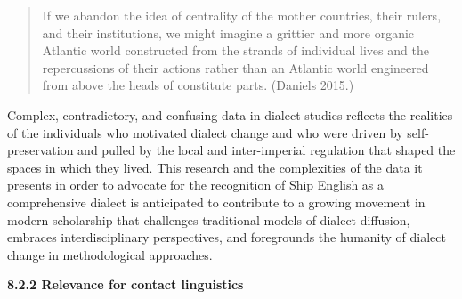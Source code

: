 \begin{quotation}
If we abandon the idea of centrality of the mother countries, their rulers, and their institutions, we might imagine a grittier and more organic Atlantic world constructed from the strands of individual lives and the repercussions of their actions rather than an Atlantic world engineered from above the heads of constitute parts. (Daniels 2015.)

\end{quotation}
\begin{styleStandard}
Complex, contradictory, and confusing data in dialect studies reflects the realities of the individuals who motivated dialect change and who were driven by self-preservation and pulled by the local and inter-imperial regulation that shaped the spaces in which they lived. This research and the complexities of the data it presents in order to advocate for the recognition of Ship English as a comprehensive dialect is anticipated to contribute to a growing movement in modern scholarship that challenges traditional models of dialect diffusion, embraces interdisciplinary perspectives, and foregrounds the humanity of dialect change in methodological approaches. 
\end{styleStandard}


\begin{styleStandard}
\textbf{8.2.2 Relevance for contact linguistics}
\end{styleStandard}


